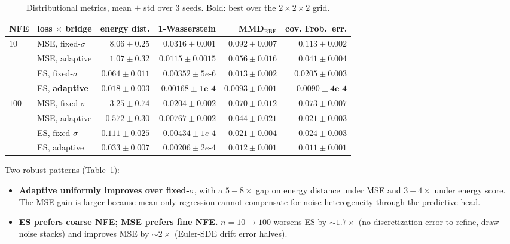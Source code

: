 \documentclass[11pt]{article}
\begin{document}
\begin{table}[t]
    \centering
    \small
    \begin{tabular}{l@{\ }l rrrr}
        \toprule
        NFE & loss $\times$ bridge & energy dist. & 1-Wasserstein & MMD$_{\text{RBF}}$ & cov. Frob.\ err. \\
        \midrule
        \multirow{4}{*}{$10$}
          & MSE, fixed-$\sigma$       & $8.06 \pm 0.25$  & $0.0316 \pm 0.001$   & $0.092 \pm 0.007$  & $0.113 \pm 0.002$  \\
          & MSE, adaptive             & $1.07 \pm 0.32$  & $0.0115 \pm 0.0015$  & $0.056 \pm 0.016$  & $0.041 \pm 0.004$  \\
          & ES, fixed-$\sigma$        & $0.064 \pm 0.011$& $0.00352 \pm 5e\text{-}6$ & $0.013 \pm 0.002$ & $0.0205 \pm 0.003$ \\
          & ES, \textbf{adaptive}     & $\bm{0.018 \pm 0.003}$ & $\bm{0.00168 \pm 1e\text{-}4}$ & $\bm{0.0093 \pm 0.001}$ & $\bm{0.0090 \pm 4e\text{-}4}$ \\
        \midrule
        \multirow{4}{*}{$100$}
          & MSE, fixed-$\sigma$       & $3.25 \pm 0.74$  & $0.0204 \pm 0.002$   & $0.070 \pm 0.012$  & $0.073 \pm 0.007$  \\
          & MSE, adaptive             & $0.572 \pm 0.30$ & $0.00767 \pm 0.002$  & $0.044 \pm 0.021$  & $0.021 \pm 0.003$  \\
          & ES, fixed-$\sigma$        & $0.111 \pm 0.025$& $0.00434 \pm 1e\text{-}4$ & $0.021 \pm 0.004$  & $0.024 \pm 0.003$  \\
          & ES, adaptive              & $0.033 \pm 0.007$& $0.00206 \pm 2e\text{-}4$ & $0.012 \pm 0.001$  & $0.011 \pm 0.001$  \\
        \bottomrule
    \end{tabular}
    \caption{Distributional metrics, mean $\pm$ std over $3$ seeds.
        Bold: best over the $2{\times}2{\times}2$ grid.}
    \label{tab:main}
\end{table}

Two robust patterns (Table~\ref{tab:main}):
\begin{itemize}
    \item \textbf{Adaptive uniformly improves over fixed-$\sigma$}, with
        a $5\!-\!8\times$ gap on energy distance under MSE and
        $3\!-\!4\times$ under energy score. The MSE gain is larger
        because mean-only regression cannot compensate for noise
        heterogeneity through the predictive head.
    \item \textbf{ES prefers coarse NFE; MSE prefers fine NFE.}
        $n=10\!\to\!100$ worsens ES by $\sim\!1.7\times$ (no
        discretization error to refine, draw-noise stacks) and improves
        MSE by $\sim\!2\times$ (Euler-SDE drift error halves).
\end{itemize}
\end{document}
